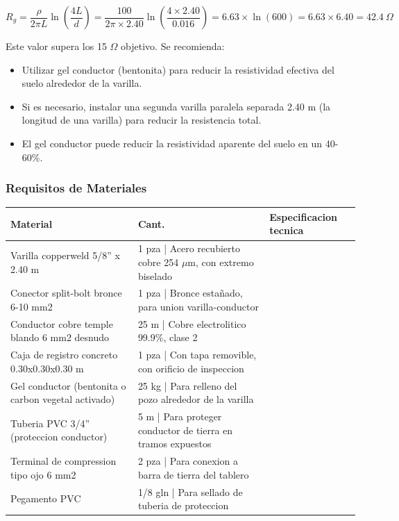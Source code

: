 \begin{equation}
R_g = \frac{\rho}{2\pi L} \ln\left(\frac{4L}{d}\right) = \frac{100}{2\pi \times 2.40} \ln\left(\frac{4 \times 2.40}{0.016}\right) = 6.63 \times \ln(600) = 6.63 \times 6.40 = 42.4\ \Omega
\end{equation}

Este valor supera los 15 $\Omega$ objetivo. Se recomienda:
\begin{itemize}
  \item Utilizar gel conductor (bentonita) para reducir la resistividad efectiva del suelo alrededor de la varilla.
  \item Si es necesario, instalar una segunda varilla paralela separada 2.40 m (la longitud de una varilla) para reducir la resistencia total.
  \item El gel conductor puede reducir la resistividad aparente del suelo en un 40-60\%.
\end{itemize}

\subsubsection{Requisitos de Materiales}

\begin{longtable}{L{5.5cm} L{2.0cm} L{7.0cm}}
\toprule
\textbf{Material} & \textbf{Cant.} & \textbf{Especificacion tecnica} \\
\midrule
Varilla copperweld 5/8'' x 2.40 m & 1 pza | Acero recubierto cobre 254 $\mu$m, con extremo biselado \\
Conector split-bolt bronce 6-10 mm2 & 1 pza | Bronce estañado, para union varilla-conductor \\
Conductor cobre temple blando 6 mm2 desnudo & 25 m | Cobre electrolitico 99.9\%, clase 2 \\
Caja de registro concreto 0.30x0.30x0.30 m & 1 pza | Con tapa removible, con orificio de inspeccion \\
Gel conductor (bentonita o carbon vegetal activado) & 25 kg | Para relleno del pozo alrededor de la varilla \\
Tuberia PVC 3/4'' (proteccion conductor) & 5 m | Para proteger conductor de tierra en tramos expuestos \\
Terminal de compression tipo ojo 6 mm2 & 2 pza | Para conexion a barra de tierra del tablero \\
Pegamento PVC & 1/8 gln | Para sellado de tuberia de proteccion \\
\bottomrule
\end{longtable}

